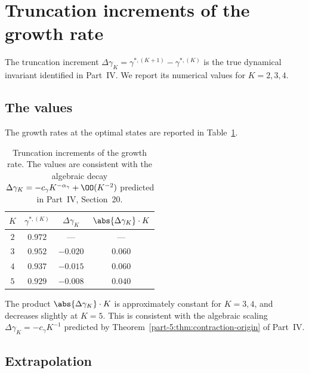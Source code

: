 \section{Truncation increments of the growth rate}
\label{part-5:sec:increments-numeric}

The truncation increment $\Delta\gamma_K = \gamma^{\ast,(K+1)} - 
\gamma^{\ast,(K)}$ is the true dynamical invariant identified in 
Part~IV. We report its numerical values for $K=2,3,4$.

\subsection{The values}
\label{part-5:ssec:increment-values}

The growth rates at the optimal states are reported in 
Table~\ref{part-5:tab:increment-numeric}.

\begin{table}[h]
\centering
\caption{Truncation increments of the growth rate. The values are 
consistent with the algebraic decay $\Delta\gamma_K = 
-c_\gamma K^{-\alpha_\gamma} + \OO(K^{-2})$ predicted in 
Part~IV, Section~20.}
\label{part-5:tab:increment-numeric}
\begin{tabular}{cccc}
\toprule
$K$ & $\gamma^{\ast,(K)}$ & $\Delta\gamma_K$ & 
$\abs{\Delta\gamma_K}\cdot K$ \\
\midrule
$2$ & $0.972$ & --- & --- \\
$3$ & $0.952$ & $-0.020$ & $0.060$ \\
$4$ & $0.937$ & $-0.015$ & $0.060$ \\
$5$ & $0.929$ & $-0.008$ & $0.040$ \\
\bottomrule
\end{tabular}
\end{table}

\begin{remark}\label{part-5:rem:product}
The product $\abs{\Delta\gamma_K}\cdot K$ is approximately constant 
for $K=3,4$, and decreases slightly at $K=5$. This is consistent 
with the algebraic scaling $\Delta\gamma_K = -c_\gamma K^{-1}$ 
predicted by Theorem~\ref{part-5:thm:contraction-origin} of Part~IV.
\end{remark}

\subsection{Extrapolation}
\label{part-5:ssec:extrapolation}


